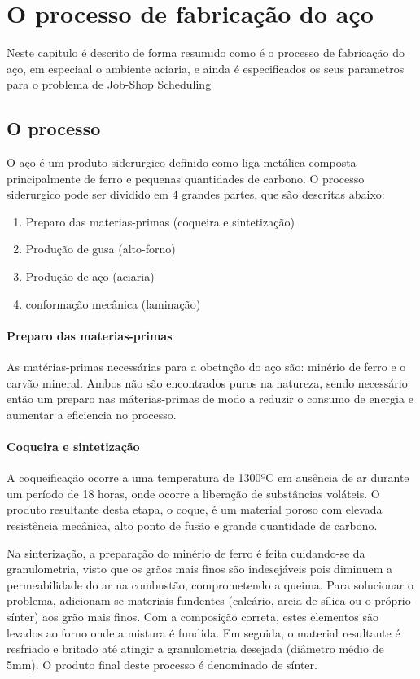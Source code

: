 \chapter{O processo de fabricação do aço}\label{fab_aco}

Neste capitulo é descrito de forma resumido como é o processo de fabricação do aço, em especiaal o ambiente aciaria, e ainda é especificados os seus parametros para o problema de Job-Shop Scheduling
\section{O processo}
\cite{UFPR} O aço é um produto siderurgico definido como liga metálica composta principalmente de ferro e pequenas quantidades de carbono. O processo siderurgico pode ser dividido em 4 grandes partes, que são descritas abaixo:
\begin {enumerate}
	\item Preparo das materias-primas (coqueira e sintetização)
	\item Produção de gusa (alto-forno)
	\item Produção de aço (aciaria)
	\item conformação mecânica (laminação)
\end{enumerate}

\subsubsection{Preparo das materias-primas}
As matérias-primas necessárias para a obetnção do aço são: minério de ferro e o carvão mineral. Ambos não são encontrados puros na natureza, sendo necessário então um preparo nas máterias-primas de modo a reduzir o consumo de energia e aumentar a eficiencia no processo.

\subsubsection{Coqueira e sintetização}
A coqueificação ocorre a uma temperatura de 1300ºC em ausência de ar durante um período de 18 horas, onde ocorre a liberação de substâncias voláteis. O produto resultante desta etapa, o coque, é um material poroso com elevada resistência mecânica, alto ponto de fusão e grande quantidade de carbono.

Na sinterização, a preparação do minério de ferro é feita cuidando-se da granulometria, visto que os grãos mais finos são indesejáveis pois diminuem a permeabilidade do ar na combustão, comprometendo a queima. Para solucionar o problema, adicionam-se materiais fundentes (calcário, areia de sílica ou o próprio sínter) aos grão mais finos.
Com a composição correta, estes elementos são levados ao forno onde a mistura é fundida. Em seguida, o material resultante é resfriado e britado até atingir a granulometria desejada (diâmetro médio de 5mm).
O produto final deste processo é denominado de sínter.

